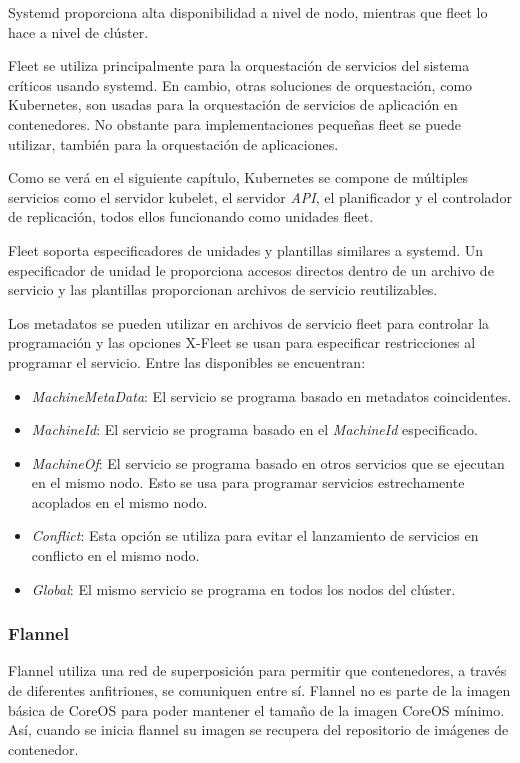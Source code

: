 Systemd proporciona alta disponibilidad a nivel de nodo, mientras que fleet lo hace a nivel de clúster.

Fleet se utiliza principalmente para la orquestación de servicios del sistema críticos usando systemd. En cambio, otras soluciones de orquestación, como Kubernetes, son usadas para la orquestación de servicios de aplicación en contenedores. No obstante para implementaciones pequeñas fleet se puede utilizar, también para la orquestación de aplicaciones.

Como se verá en el siguiente capítulo, Kubernetes se compone de múltiples servicios como el servidor kubelet, el servidor \textit{API}, el planificador y el controlador de replicación, todos ellos funcionando como unidades fleet. 

Fleet soporta especificadores de unidades y plantillas similares a systemd. Un especificador de unidad le proporciona accesos directos dentro de un archivo de servicio y las plantillas proporcionan archivos de servicio reutilizables.

Los metadatos se pueden utilizar en archivos de servicio fleet para controlar la programación y las opciones X-Fleet se usan para especificar restricciones al programar el servicio. Entre las disponibles se encuentran:
\begin{itemize}
\item \textit{MachineMetaData}: El servicio se programa basado en metadatos coincidentes.
\item \textit{MachineId}: El servicio se programa basado en el \textit{MachineId} especificado.
\item \textit{MachineOf}: El servicio se programa basado en otros servicios que se ejecutan en el mismo nodo. Esto se usa para programar servicios estrechamente acoplados en el mismo nodo.
\item \textit{Conflict}: Esta opción se utiliza para evitar el lanzamiento de servicios en conflicto en el mismo nodo.
\item \textit{Global}: El mismo servicio se programa en todos los nodos del clúster.
\end{itemize}

\subsubsection{Flannel}

Flannel utiliza una red de superposición para permitir que contenedores, a través de diferentes anfitriones, se comuniquen entre sí. Flannel no es parte de la imagen básica de CoreOS para poder mantener el tamaño de la imagen CoreOS mínimo. Así, cuando se inicia flannel su imagen se recupera del repositorio de imágenes de contenedor. 

